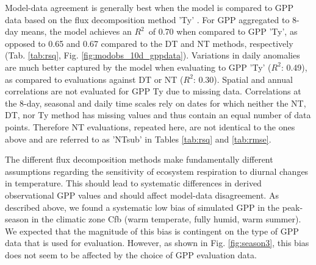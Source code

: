 \documentclass{myreport}
\newcommand{\rsq}{$R^2$}
\begin{document}
Model-data agreement is generally best when the model is compared to GPP data based on the flux decomposition method 'Ty' \citep{wang17natpl}. For GPP aggregated to 8-day means, the model achieves an \rsq\ of 0.70 when compared to GPP 'Ty', as opposed to 0.65 and 0.67 compared to the DT and NT methods, respectively (Tab. \ref{tab:rsq}, Fig. \ref{fig:modobs_10d_gppdata}). Variations in daily anomalies are much better captured by the model when evaluating to GPP 'Ty' (\rsq : 0.49), as compared to evaluations against DT or NT (\rsq : 0.30). Spatial and annual correlations are not evaluated for GPP Ty due to missing data. Correlations at the 8-day, seasonal and daily time scales rely on dates for which neither the NT, DT, nor Ty method has missing values and thus contain an equal number of data points. Therefore NT evaluations, repeated here, are not identical to the ones above and are referred to as 'NTsub' in Tables \ref{tab:rsq} and \ref{tab:rmse}. 

The different flux decomposition methods make fundamentally different assumptions regarding the sensitivity of ecosystem respiration to diurnal changes in temperature. This should lead to systematic differences in derived observational GPP values and should affect model-data disagreement. As described above, we found a systematic low bias of simulated GPP in the peak-season in the climatic zone Cfb (warm temperate, fully humid, warm summer). We expected that the magnitude of this bias is contingent on the type of GPP data that is used for evaluation. However, as shown in Fig. \ref{fig:season3}, this bias does not seem to be affected by the choice of GPP evaluation data.
\end{document}
